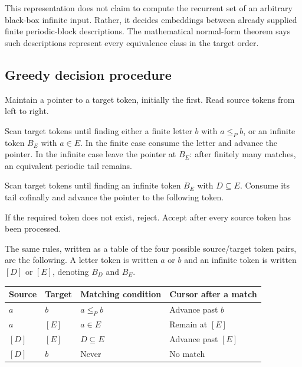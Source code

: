 \documentclass[11pt,a4paper]{article}
\numberwithin{equation}{section}
\theoremstyle{definition}
\theoremstyle{remark}
\begin{document}
This representation does not claim to compute the recurrent set of an
arbitrary black-box infinite input. Rather, it decides embeddings between
already supplied finite periodic-block descriptions. The mathematical
normal-form theorem says such descriptions represent every equivalence
class in the target order.

\subsection{Greedy decision procedure}
Maintain a pointer to a target token, initially the first. Read source
tokens from left to right.

\begin{description}[style=nextline,leftmargin=0pt,labelwidth=0pt,labelindent=0pt]
\item[Source token is a finite letter $a$.]
Scan target tokens until finding either a finite letter $b$ with $a\le_P b$,
or an infinite token $B_E$ with $a\in E$. In the finite case consume the
letter and advance the pointer. In the infinite case leave the pointer at
$B_E$: after finitely many matches, an equivalent periodic tail remains.
\item[Source token is an infinite block $B_D$.]
Scan target tokens until finding an infinite token $B_E$ with $D\subseteq E$.
Consume its tail cofinally and advance the pointer to the following token.
\end{description}
If the required token does not exist, reject. Accept after every source
token has been processed.

The same rules, written as a table of the four possible source/target token
pairs, are the following. A letter token is written $a$ or $b$ and an
infinite token is written $[D]$ or $[E]$, denoting $B_D$ and $B_E$.

\begin{center}
\begin{tabular}{@{}llll@{}}
\toprule
Source & Target & Matching condition & Cursor after a match\\
\midrule
$a$ & $b$ & $a\le_P b$ & Advance past $b$\\
$a$ & $[E]$ & $a\in E$ & Remain at $[E]$\\
$[D]$ & $[E]$ & $D\subseteq E$ & Advance past $[E]$\\
$[D]$ & $b$ & Never & No match\\
\bottomrule
\end{tabular}
\end{center}
\end{document}

